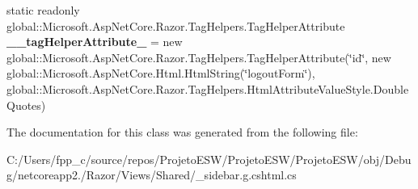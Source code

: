 \begin{DoxyCompactItemize}
\item 
\mbox{\label{class_asp_net_core_1_1_views___shared____sidebar_a79d7de77d8125805973489850732b46c}} 
static readonly global\+::\+Microsoft.\+Asp\+Net\+Core.\+Razor.\+Tag\+Helpers.\+Tag\+Helper\+Attribute {\bfseries \+\_\+\+\_\+tag\+Helper\+Attribute\+\_} = new global\+::\+Microsoft.\+Asp\+Net\+Core.\+Razor.\+Tag\+Helpers.\+Tag\+Helper\+Attribute(\char`\"{}id\char`\"{}, new global\+::\+Microsoft.\+Asp\+Net\+Core.\+Html.\+Html\+String(\char`\"{}logout\+Form\char`\"{}), global\+::\+Microsoft.\+Asp\+Net\+Core.\+Razor.\+Tag\+Helpers.\+Html\+Attribute\+Value\+Style.\+Double\+Quotes)
\end{DoxyCompactItemize}


The documentation for this class was generated from the following file\+:\begin{DoxyCompactItemize}
\item 
C\+:/\+Users/fpp\+\_\+c/source/repos/\+Projeto\+E\+S\+W/\+Projeto\+E\+S\+W/\+Projeto\+E\+S\+W/obj/\+Debug/netcoreapp2./\+Razor/\+Views/\+Shared/\+\_\+sidebar.\+g.\+cshtml.\+cs\end{DoxyCompactItemize}
